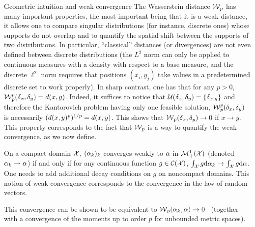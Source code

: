 \begin{rem2}{Geometric intuition and weak convergence}
The Was\-ser\-stein distance $\operatorname{\mathcal{W}}_p$ has many important properties, the most important being that it is a weak distance, \ie it allows one to compare singular distributions (for instance, discrete ones) whose supports do not overlap and to quantify the spatial shift between the supports of two distributions.
%
In particular, ``classical'' distances (or divergences) are not even defined between discrete distributions (the $L^2$ norm can only be applied to continuous measures with a density with respect to a base measure, and the discrete $\ell^2$ norm requires that positions $(x_i,y_j)$ take values in a predetermined discrete set to work properly). In sharp contrast, one has that for any $p> 0$, $\operatorname{\mathcal{W}}_p^p(\delta_x,\delta_y) = d(x,y)$. Indeed, it suffices to notice that $\mathcal{U}(\delta_x,\delta_y)=\{ \delta_{x,y}\}$ and therefore the Kantorovich problem having only one feasible solution, $\operatorname{\mathcal{W}}_p^p(\delta_x,\delta_y)$ is necessarily $(d(x,y)^p)^{1/p}=d(x,y)$. This shows that $\operatorname{\mathcal{W}}_p(\delta_x,\delta_y) \rightarrow 0$ if $x \rightarrow y$.
%
This property corresponds to the fact that $\operatorname{\mathcal{W}}_p$ is a way to quantify the weak convergence, as we now define.

\begin{defn}\label{dfn-weak-conv}
	On a compact domain $\mathcal{X}$, $(\alpha_k)_k$ converges weakly to $\alpha$ in $\mathcal{M}_+^1(\mathcal{X})$ (denoted $\alpha_k \rightharpoonup \alpha$) if and only if for any continuous function $g \in \mathcal{C}(\mathcal{X})$, $\int_{\mathcal{X}} g \mathrm{d}\alpha_k \rightarrow \int_{\mathcal{X}} g \mathrm{d}\alpha$.
	One needs to add additional decay conditions on $g$ on noncompact domains.
	This notion of weak convergence corresponds to the convergence in the law of random vectors.
\end{defn}

This convergence can be shown to be equivalent to $\operatorname{\mathcal{W}}_p(\alpha_k,\alpha) \rightarrow 0$~\citep[Theorem 6.8]{Villani09} (together with a convergence of the moments up to order $p$ for unbounded metric spaces).
\end{rem2}


